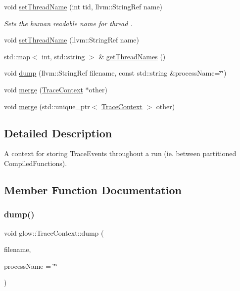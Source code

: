 \begin{DoxyCompactItemize}
\mbox{\label{classglow_1_1_trace_context_ab00976ef787c4a5b6ba8404a11622876}} 
void \hyperlink{classglow_1_1_trace_context_ab00976ef787c4a5b6ba8404a11622876}{set\+Thread\+Name} (int tid, llvm\+::\+String\+Ref name)
\begin{DoxyCompactList}\small\item\em Sets the human readable {\ttfamily name} for thread . \end{DoxyCompactList}\item 
void \hyperlink{classglow_1_1_trace_context_ac663b3fff088f7c9a70c0d31f5501ea0}{set\+Thread\+Name} (llvm\+::\+String\+Ref name)
\item 
std\+::map$<$ int, std\+::string $>$ \& \hyperlink{classglow_1_1_trace_context_a57fb8a38c0ab7d3b17c1e61e504bd359}{get\+Thread\+Names} ()
\item 
void \hyperlink{classglow_1_1_trace_context_aa24c1e719b7a562bdafcd9079d98c680}{dump} (llvm\+::\+String\+Ref filename, const std\+::string \&process\+Name=\char`\"{}\char`\"{})
\item 
void \hyperlink{classglow_1_1_trace_context_a8692d50a5df71cd51a2906a0943de4c8}{merge} (\hyperlink{classglow_1_1_trace_context}{Trace\+Context} $\ast$other)
\item 
void \hyperlink{classglow_1_1_trace_context_a440b03f909dacec97974f02ba41ec2f7}{merge} (std\+::unique\+\_\+ptr$<$ \hyperlink{classglow_1_1_trace_context}{Trace\+Context} $>$ other)
\end{DoxyCompactItemize}


\subsection{Detailed Description}
A context for storing Trace\+Events throughout a run (ie. between partitioned Compiled\+Functions). 

\subsection{Member Function Documentation}
\mbox{\label{classglow_1_1_trace_context_aa24c1e719b7a562bdafcd9079d98c680}} 
\subsubsection{\texorpdfstring{dump()}{dump()}}
{\footnotesize\ttfamily void glow\+::\+Trace\+Context\+::dump (\begin{DoxyParamCaption}\item[{llvm\+::\+String\+Ref}]{filename,  }\item[{const std\+::string \&}]{process\+Name = {\ttfamily \char`\"{}\char`\"{}} }\end{DoxyParamCaption})}


